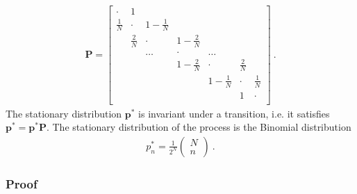 \documentclass[letterpaper,10pt,english]{jupyterBook}
\begin{document}
\begin{equation*}
\begin{split}\mathbf{P} = \begin{bmatrix}
\cdot       & 1           &               &               &               &             &             \\ 
\frac{1}{N} & \cdot       & 1-\frac{1}{N} &               &               &             &             \\ 
            & \frac{2}{N} & \cdot         & 1-\frac{2}{N} &               &             &             \\ 
            &             & \dots         & \cdot         &         \dots &             &             \\ 
            &             &               & 1-\frac{2}{N} &         \cdot & \frac{2}{N} &             \\ 
            &             &               &               & 1-\frac{1}{N} & \cdot       & \frac{1}{N} \\ 
            &             &               &               &               & 1           & \cdot       \\ 
\end{bmatrix} \ .
\end{split}
\end{equation*}
\sphinxAtStartPar
{} The stationary distribution \(\mathbf{p}^*\) is invariant under a transition, i.e. it satisfies \(\mathbf{p}^* = \mathbf{p}^* \mathbf{P}\). The stationary distribution of the process is the Binomial distribution
\begin{equation*}
\begin{split}p^*_n = \frac{1}{2^N} \left( \begin{matrix} N \\ n \end{matrix} \right) \ .\end{split}
\end{equation*}\subsubsection*{Proof}
\end{document}
